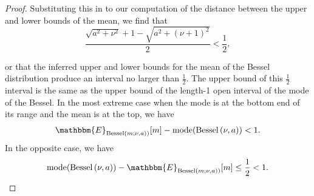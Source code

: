 \documentclass[letterpaper]{article}
\newcommand{\Bess}[1]{\textup{Bessel}\left( #1 \right)}
\begin{document}
\begin{proof}
  Substituting this in to our computation of the distance between the upper and
  lower bounds of the mean, we find that
  \begin{equation}
  \frac{\sqrt{a^2 + \nu^2} + 1 - \sqrt{a^2 + (\nu + 1)^2}}{2} < \frac{1}{2},
  \end{equation}
  
  or that the inferred upper and lower bounds for the mean of the Bessel
  distribution produce an interval no larger than $\frac{1}{2}$. The upper bound
  of this $\frac{1}{2}$ interval is the same as the upper bound of the length-1
  open interval of the mode of the Bessel. In the most extreme case when the
  mode is at the bottom end of its range and the mean is at the top, we have
  \[
      \mathbbm{E}_{\Bess{m; \nu, a})}[m] - \textup{mode}(\Bess{\nu, a}) < 1.
  \]
  In the opposite case, we have 
  \[
      \textup{mode}(\Bess{\nu, a}) - \mathbbm{E}_{\Bess{m; \nu, a})}[m] \leq \frac{1}{2} < 1.
  \]
  \end{proof}
  
  
  
  
\end{document}

